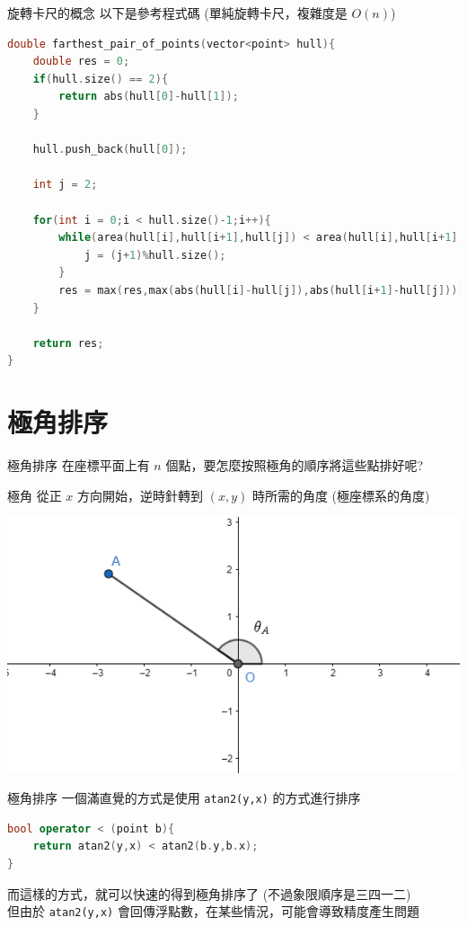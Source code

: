 \documentclass[aspectratio=169]{beamer}
\begin{document}
\begin{frame}[fragile]{旋轉卡尺的概念}
    以下是參考程式碼 (單純旋轉卡尺，複雜度是 $O(n)$)
    \begin{lstlisting}[language=C++,basicstyle=\ttfamily\tiny]
double farthest_pair_of_points(vector<point> hull){
    double res = 0;
    if(hull.size() == 2){
        return abs(hull[0]-hull[1]);
    }
 
    hull.push_back(hull[0]);
    
    int j = 2;
 
    for(int i = 0;i < hull.size()-1;i++){
        while(area(hull[i],hull[i+1],hull[j]) < area(hull[i],hull[i+1],hull[(j+1)%hull.size()])){
            j = (j+1)%hull.size();
        }
        res = max(res,max(abs(hull[i]-hull[j]),abs(hull[i+1]-hull[j])));
    }
 
    return res;
}
    \end{lstlisting}
\end{frame}

\section{極角排序}

\begin{frame}[fragile]{極角排序}
    在座標平面上有 $n$ 個點，要怎麼按照極角的順序將這些點排好呢?
    \begin{alertblock}{極角}
        從正 $x$ 方向開始，逆時針轉到 $(x,y)$ 時所需的角度 (極座標系的角度)
    \end{alertblock}
    \begin{center}
        \includegraphics[scale=0.4]{images/polar_angle.png}
    \end{center}
\end{frame}

\begin{frame}[fragile]{極角排序}
    一個滿直覺的方式是使用 \texttt{atan2(y,x)} 的方式進行排序
    \begin{lstlisting}[language=C++,basicstyle=\ttfamily\small]
bool operator < (point b){
    return atan2(y,x) < atan2(b.y,b.x);
}
    \end{lstlisting}
    而這樣的方式，就可以快速的得到極角排序了 (不過象限順序是三四一二) \\
    \vspace{2.5mm}
    但由於 \texttt{atan2(y,x)} 會回傳浮點數，在某些情況，可能會導致精度產生問題 
\end{frame}
\end{document}
